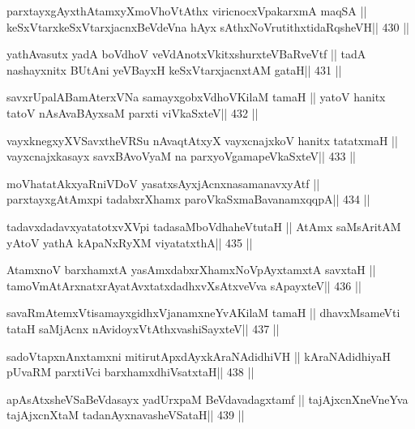\begin{shl}
parxtayxgAyxthAtamxyXmoVhoVtAthx viricnocxVpakarxmA maqSA ||
keSxVtarxkeSxVtarxjacnxBeVdeVna hAyx sAthxNoVrutithxtidaRqsheVH\hfill || 430 ||
\end{shl}

\begin{shl}
yathAvasutx yadA boVdhoV veVdAnotxVkitxshurxteVBaRveVtf ||
tadA nashayxnitx BUtAni yeVBayxH keSxVtarxjacnxtAM gataH\hfill || 431 ||
\end{shl}

\begin{shl}
savxrUpalABamAterxVNa samayxgobxVdhoV\s KilaM tamaH ||
yatoV hanitx tatoV nAsAvaBAyxsaM parxti viVkaSxteV\hfill || 432 ||
\end{shl}

\begin{shl}
vayxknegxyXVSavxtheVRSu nA\s\s vaqtAtxyX vayxcnajxkoV hanitx tatatxmaH ||
vayxcnajxkasayx savxBAvoV\s yaM na parxyoVgamapeVkaSxteV\hfill || 433 ||
\end{shl}

\begin{shl}
moVhatatAkxyaRniVDoV yasatxsAyxjAcnxnasamanavxyAtf ||
parxtayxgAtAmx\s pi tadabxrXhamx paroVkaSxmaBavanamxqqpA\hfill || 434 ||
\end{shl}

\begin{shl}
tadavxdadavxyatatotxvXV\s pi tadasaMboVdhaheVtutaH ||
AtAmx saMsAritAM yAtoV yathA kApaNxRyXM viyatatxthA\hfill || 435 ||
\end{shl}

\begin{shl}
AtamxnoV barxhamxtA yasAmxdabxrXhamxNoV\s pAyxtamxtA savxtaH ||
tamoVmAtArxnatxrAyatAvxtatxdadhxvXsAtxveVva sA\s\s payxteV\hfill || 436 ||
\end{shl}

\begin{shl}
savaRmAtemxVtisamayxgidhxVjanamxneYvAKilaM tamaH ||
dhavxMsameVti tataH saMjAcnx nAvidoyxVtAthx\s vashiSayxteV\hfill || 437 ||
\end{shl}

\begin{shl}
sadoVtapxnAnx\s\s tamxni mitirutApxdAyx\s kAraNAdidhiVH ||
kAraNAdidhiyaH pUvaRM parxtiVci barxhamxdhiVsatxtaH\hfill || 438 ||
\end{shl}

\begin{shl}
apAsAtxsheVSaBeVdasayx yadUrxpaM BeVdavadagxtamf ||
tajAjxcnXneVneYva tajAjxcnXtaM tadanAyxnavasheVSataH\hfill || 439 ||
\end{shl}

